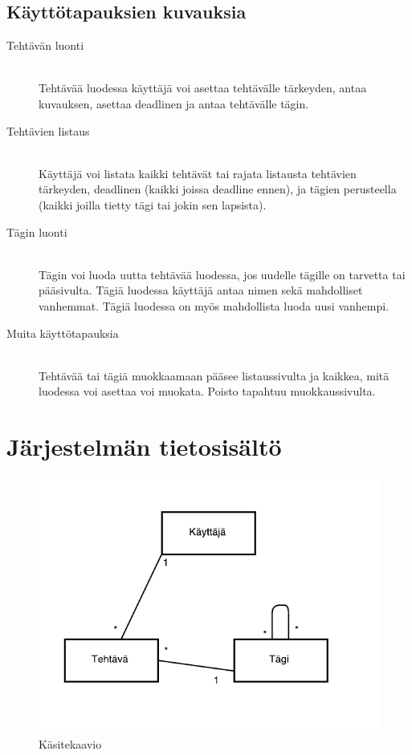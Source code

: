 \documentclass[a4paper, 12pt, finnish]{article}
\begin{document}
\subsection{Käyttötapauksien kuvauksia}
\begin{description}
  \item[Tehtävän luonti] \hfill \\
  Tehtävää luodessa käyttäjä voi asettaa tehtävälle tärkeyden, antaa kuvauksen,
  asettaa deadlinen ja antaa tehtävälle tägin.
  \item[Tehtävien listaus] \hfill \\
  Käyttäjä voi listata kaikki tehtävät tai rajata listausta tehtävien tärkeyden,
  deadlinen (kaikki joissa deadline ennen), ja tägien perusteella (kaikki joilla tietty
  tägi tai jokin sen lapsista).
  \item[Tägin luonti] \hfill \\
  Tägin voi luoda uutta tehtävää luodessa, jos uudelle tägille on tarvetta tai
  pääsivulta. Tägiä luodessa käyttäjä antaa nimen sekä mahdolliset vanhemmat.
  Tägiä luodessa on myös mahdollista luoda uusi vanhempi.
  \item[Muita käyttötapauksia] \hfill \\
  Tehtävää tai tägiä muokkaamaan pääsee listaussivulta ja kaikkea, mitä luodessa
  voi asettaa voi muokata. Poisto tapahtuu muokkaussivulta.
\end{description}

\section{Järjestelmän tietosisältö}

\begin{figure}[h]
  \caption{Käsitekaavio}
  \centering
  \includegraphics[scale=1.0]{kasitekaavio}
\end{figure}
\end{document}

